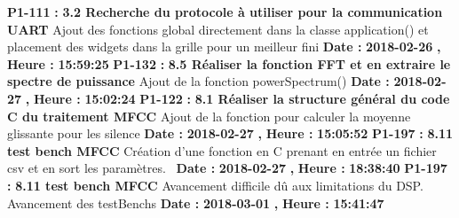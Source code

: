 \documentclass{article}%
\begin{document}
\newline%
%
\textbf{P1{-}111 }%
\textbf{ : }%
\textbf{ 3.2 Recherche du protocole à utiliser pour la communication UART}%
\newline%
\newline%
%
Ajout des fonctions global directement dans la classe application() et placement des widgets dans la grille pour un meilleur fini\newline%
\newline%
%
\textbf{Date : }%
\textbf{2018{-}02{-}26}%
\textbf{,}%
\textbf{ Heure : }%
\textbf{15:59:25}%
\newline%
%
\textbf{P1{-}132 }%
\textbf{ : }%
\textbf{ 8.5 Réaliser la fonction FFT et en extraire le spectre de puissance}%
\newline%
\newline%
%
Ajout de la fonction powerSpectrum()\newline%
\newline%
%
\textbf{Date : }%
\textbf{2018{-}02{-}27}%
\textbf{,}%
\textbf{ Heure : }%
\textbf{15:02:24}%
\newline%
%
\textbf{P1{-}122 }%
\textbf{ : }%
\textbf{ 8.1 Réaliser la structure général du code C du traitement MFCC}%
\newline%
\newline%
%
Ajout de la fonction pour calculer la moyenne glissante pour les silence\newline%
\newline%
%
\textbf{Date : }%
\textbf{2018{-}02{-}27}%
\textbf{,}%
\textbf{ Heure : }%
\textbf{15:05:52}%
\newline%
%
\textbf{P1{-}197 }%
\textbf{ : }%
\textbf{ 8.11 test bench MFCC}%
\newline%
\newline%
%
Création d'une fonction en C prenant en entrée un fichier csv et en sort les paramètres.~\newline%
\newline%
%
\textbf{Date : }%
\textbf{2018{-}02{-}27}%
\textbf{,}%
\textbf{ Heure : }%
\textbf{18:38:40}%
\newline%
%
\textbf{P1{-}197 }%
\textbf{ : }%
\textbf{ 8.11 test bench MFCC}%
\newline%
\newline%
%
Avancement difficile dû aux limitations du DSP. Avancement des testBenchs\newline%
\newline%
%
\textbf{Date : }%
\textbf{2018{-}03{-}01}%
\textbf{,}%
\textbf{ Heure : }%
\textbf{15:41:47}%
\end{document}
